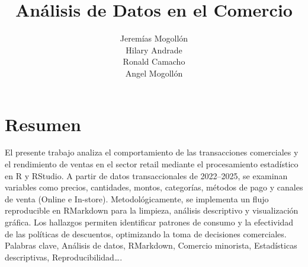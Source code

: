\documentclass[oneside,11pt]{Latex/Classes/PhDthesisPSnPDF}
\title{Análisis de Datos en el Comercio}
\author{Jeremías Mogollón \\ Hilary Andrade \\ Ronald Camacho \\ Angel
Mogollón}
\begin{document}
\maketitle

\frontmatter


\setcounter{secnumdepth}{3}
\setcounter{tocdepth}{3}

\tableofcontents



\cleardoublepage

  \cleardoublepage       %
  \chapter*{Resumen}     %
  
  El presente trabajo analiza el comportamiento de las transacciones
comerciales y el rendimiento de ventas en el sector retail mediante el
procesamiento estadístico en R y RStudio. A partir de datos
transaccionales de 2022--2025, se examinan variables como precios,
cantidades, montos, categorías, métodos de pago y canales de venta
(Online e In-store). Metodológicamente, se implementa un flujo
reproducible en RMarkdown para la limpieza, análisis descriptivo y
visualización gráfica. Los hallazgos permiten identificar patrones de
consumo y la efectividad de las políticas de descuentos, optimizando la
toma de decisiones comerciales. Palabras clave, Análisis de datos,
RMarkdown, Comercio minorista, Estadísticas descriptivas,
Reproducibilidad\ldots.             %
  
  \cleardoublepage

\mainmatter
\def\baselinestretch{1.5}

\end{document}
